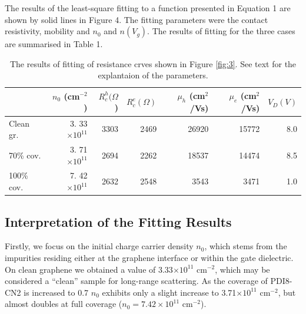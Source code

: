 \documentclass[preprint,aip,jap]{revtex4-2}
\begin{document}
\noindent The results of the least-square fitting to a function presented in Equation 1 are shown by solid lines in Figure 4.
 The fitting parameters were the contact resistivity, mobility and $n_0$ and $n(V_g)$.
  The results of fitting for the three cases are summarised in Table 1.

\noindent \begin{table}[h]
  \centering
  \begin{tabular}{|l|r|r|r|r|r|r|} \hline%
   & $n_{0}$ (cm$^{-2}$ )& $R_{c}^{h}(\Omega$) & $R_{c}^{e}(\Omega)$ & $\mu_{h}$ (cm$^{2}$/Vs) & $\mu_{e}$ (cm$^{2}$/Vs) & $V_{D}(V) $  \\ \hline%
    Clean gr.
 & 3.
33$\times 10^{11}$ & 3303 & 2469 & 26920 & 15772 & 8.0 \\
    70\% cov.
 &3.
71$\times 10^{11}$ & 2694 & 2262 & 18537 & 14474 & 8.5 \\
     100\% cov.
 &7.
42$\times 10^{11}$ & 2632 & 2548 & 3543 & 3471 & 1.0 \\ \hline
    
  \end{tabular}
  \caption{The results of fitting of resistance crves shown in Figure \ref{fig:3}.
 See  text for the explantaion of the parameters.
}
  \label{tab:1}
\end{table}

\subsection{Interpretation of the Fitting Results}
\label{sec:interp}

Firstly, we focus on the initial charge carrier density $n_0$, which stems from the impurities residing either at the graphene interface or within the gate dielectric.
 On clean graphene we obtained a value of 3.33$\times 10^{11}$ cm$^{-2}$, which may be considered a ``clean'' sample for long-range scattering.
  As the coverage of PDI8-CN2 is increased to 0.7 $n_0$ exhibits only a slight increase to 3.71$\times 10^{11}$ cm$^{-2}$, but almost doubles at full coverage ($n_{0}=7.42\times 10^{11}$ cm$^{-2}$).
\end{document}
